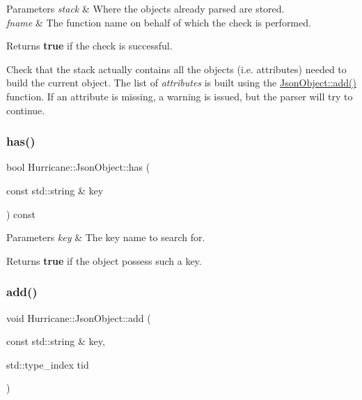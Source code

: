 \begin{DoxyParams}{Parameters}
{\em stack} & Where the objects already parsed are stored. \\
\hline
{\em fname} & The function name on behalf of which the check is performed. \\
\hline
\end{DoxyParams}
\begin{DoxyReturn}{Returns}
{\bfseries true} if the check is successful.
\end{DoxyReturn}
Check that the {\ttfamily stack} actually contains all the objects (i.\+e. attributes) needed to build the current object. The list of {\itshape attributes} is built using the \hyperlink{classHurricane_1_1JsonObject_a39ed04c118b19f1b6010b7f3336c360f}{Json\+Object\+::add()} function. If an attribute is missing, a warning is issued, but the parser will try to continue. \mbox{\label{classHurricane_1_1JsonObject_ac0b8816eab2cbcabf18d5421a59aa780}} 
\subsubsection{\texorpdfstring{has()}{has()}}
{\footnotesize\ttfamily bool Hurricane\+::\+Json\+Object\+::has (\begin{DoxyParamCaption}\item[{const std\+::string \&}]{key }\end{DoxyParamCaption}) const}


\begin{DoxyParams}{Parameters}
{\em key} & The key name to search for. \\
\hline
\end{DoxyParams}
\begin{DoxyReturn}{Returns}
{\bfseries true} if the object possess such a key. 
\end{DoxyReturn}
\mbox{\label{classHurricane_1_1JsonObject_a39ed04c118b19f1b6010b7f3336c360f}} 
\subsubsection{\texorpdfstring{add()}{add()}}
{\footnotesize\ttfamily void Hurricane\+::\+Json\+Object\+::add (\begin{DoxyParamCaption}\item[{const std\+::string \&}]{key,  }\item[{std\+::type\+\_\+index}]{tid }\end{DoxyParamCaption})}



